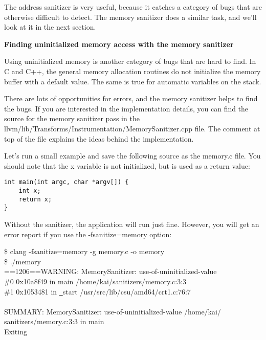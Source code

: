 The address sanitizer is very useful, because it catches a category of bugs that are otherwise difficult to detect. The memory sanitizer does a similar task, and we'll look at it in the next section.\par

\hspace*{\fill} \par %
\textbf{Finding uninitialized memory access with the memory sanitizer}

Using uninitialized memory is another category of bugs that are hard to find. In C and C++, the general memory allocation routines do not initialize the memory buffer with a default value. The same is true for automatic variables on the stack.\par

There are lots of opportunities for errors, and the memory sanitizer helps to find the bugs. If you are interested in the implementation details, you can find the source for the memory sanitizer pass in the llvm/lib/Transforms/Instrumentation/MemorySanitizer.cpp file. The comment at top of the file explains the ideas behind the implementation.\par

Let's run a small example and save the following source as the memory.c file. You should note that the x variable is not initialized, but is used as a return value:\par

\begin{lstlisting}[caption={}]
int main(int argc, char *argv[]) {
	int x;
	return x;
}
\end{lstlisting}

Without the sanitizer, the application will run just fine. However, you will get an error report if you use the -fsanitize=memory option:\par

\begin{tcolorbox}[colback=white,colframe=black]
\$ clang -fsanitize=memory -g memory.c -o memory \\
\$ ./memory \\
==1206==WARNING: MemorySanitizer: use-of-uninitialized-value \\
\hspace*{1cm}\#0 0x10a8f49 in main /home/kai/sanitizers/memory.c:3:3 \\
\hspace*{1cm}\#1 0x1053481 in \underline{~}start /usr/src/lib/csu/amd64/crt1.c:76:7 \\
\\
SUMMARY: MemorySanitizer: use-of-uninitialized-value /home/kai/ \\
sanitizers/memory.c:3:3 in main \\
Exiting
\end{tcolorbox}

